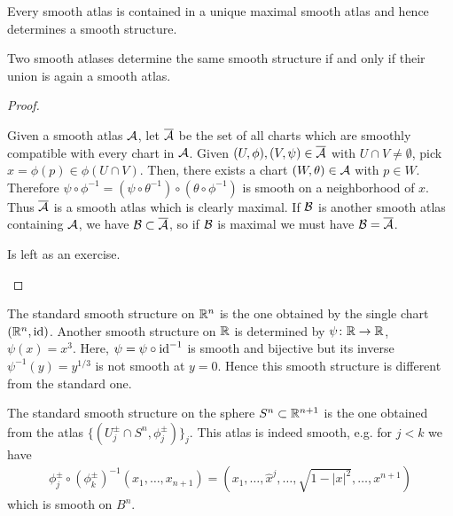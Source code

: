 \documentclass{skript}
\begin{document}
\begin{prop}
    \begin{alphanumerate}
        \item
            Every smooth atlas is contained in a unique maximal smooth atlas and hence determines a smooth structure.
        \item 
            Two smooth atlases determine the same smooth structure if and only if their union is again a smooth atlas.
    \end{alphanumerate}
\end{prop}
\begin{proof}
    \begin{alphanumerate}
        \item
            Given a smooth atlas $\mathcal{A}$, let $\overline {\mathcal{A}}$ be the set of all charts which are smoothly compatible with every chart in $\mathcal{A}$.
            Given $(U,\phi), (V,\psi)\in \overline {\mathcal{A}}$ with $U\cap V\neq \emptyset$, pick $x=\phi(p) \in \phi(U\cap V)$.
            Then, there exists a chart $(W,\theta)\in \mathcal{A}$ with $p\in W$.
            Therefore $\psi \circ\phi^{-1} = (\psi\circ \theta^{-1}) \circ (\theta\circ \phi^{-1})$ is smooth on a neighborhood of $x$.
            Thus $\overline {\mathcal{A}}$ is a smooth atlas which is clearly maximal.
            If $\mathcal{B}$ is another smooth atlas containing $\mathcal{A}$, we have $\mathcal{B} \subset\overline {\mathcal{A}}$, so if $\mathcal{B}$ is maximal we must have $\mathcal{B} = \overline {\mathcal{A}}$.
        \item 
            Is left as an exercise.
    \end{alphanumerate}
\end{proof}

\begin{bsp}
    The standard smooth structure on $\mathbb{R}^n$ is the one obtained by the single chart $(\mathbb{R}^n, \mathrm{id})$.
    Another smooth structure on $\mathbb{R}$ is determined by $\psi\colon \mathbb{R}\to \mathbb{R}$, $\psi(x) = x^3$.
    Here, $\psi = \psi\circ \mathrm{id}^{-1}$ is smooth and bijective but its inverse $\psi^{-1}(y) = y^{1/3}$ is not smooth at $y=0$.
    Hence this smooth structure is different from the standard one.
\end{bsp}

\begin{bsp}[Spheres]
    The standard smooth structure on the sphere $S^n\subset\mathbb{R}^{n+1}$ is the one obtained from the atlas $\{(U^\pm_j\cap S^n, \phi^\pm_j)\}_j$.
    This atlas is indeed smooth, e.g. for $j<k$ we have 
    \begin{align*}
        \phi^\pm_j\circ (\phi_k^\pm)^{-1}(x_1,\dots, x_{n+1}) = \left(x_1,\dots, \hat x^j, \dots, \sqrt{1-|x|^2}, \dots, x^{n+1}\right)
    \end{align*}
    which is smooth  on $B^n$.
\end{bsp}
\end{document}
